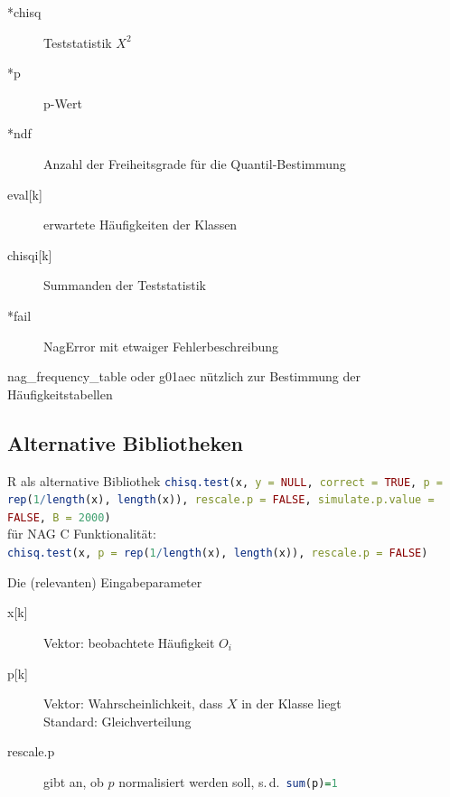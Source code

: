 \documentclass{beamer}
\begin{document}
\begin{frame}{\insertsubsection}
\begin{definition}[Rückgabeparameter]
	\begin{description}
	\item[*chisq] Teststatistik $X^2$
	\item[*p] p-Wert
	\item[*ndf] Anzahl der Freiheitsgrade für die Quantil-Bestimmung
	\item[eval{[k]}] erwartete Häufigkeiten der Klassen
	\item[chisqi{[k]}] Summanden der Teststatistik
	\item[*fail] NagError mit etwaiger Fehlerbeschreibung
	\end{description}
\end{definition}
\begin{block}{nag\_frequency\_table oder g01aec}
	nützlich zur Bestimmung der Häufigkeitstabellen
\end{block}
\end{frame}

\subsection{Alternative Bibliotheken}
\begin{frame}{\insertsubsection}
\begin{block}{R als alternative Bibliothek}
\lstinline[language=R]!chisq.test(x, y = NULL, correct = TRUE, p = rep(1/length(x), length(x)), rescale.p = FALSE, simulate.p.value = FALSE, B = 2000)!
\\[1.5ex]
für NAG C Funktionalität:
\\
\lstinline[language=R]!chisq.test(x, p = rep(1/length(x), length(x)), rescale.p = FALSE)!
\end{block}
\begin{block}{Die (relevanten) Eingabeparameter}
\begin{description}
	\item[x{[k]}] Vektor: beobachtete Häufigkeit $O_i$
	\item[p{[k]}] Vektor: Wahrscheinlichkeit, dass $X$ in der Klasse liegt\\ Standard: Gleichverteilung
	\item[rescale.p] gibt an, ob $p$ normalisiert werden soll, s.\,d.~\lstinline[language=R]!sum(p)=1!
\end{description}
\end{block}
\end{frame}
\end{document}
